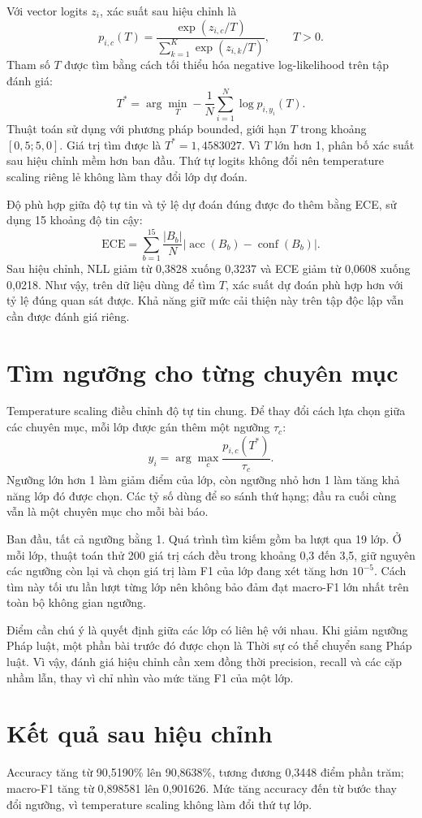 Với vector logits $z_i$, xác suất sau hiệu chỉnh là
\[
p_{i,c}(T)=\frac{\exp(z_{i,c}/T)}{\sum_{k=1}^{K}\exp(z_{i,k}/T)},\qquad T>0.
\]
Tham số $T$ được tìm bằng cách tối thiểu hóa negative log-likelihood trên tập đánh giá:
\[
T^*=\arg\min_T-\frac{1}{N}\sum_{i=1}^{N}\log p_{i,y_i}(T).
\]
Thuật toán sử dụng  với phương pháp bounded, giới hạn $T$ trong khoảng $[0{,}5;5{,}0]$. Giá trị tìm được là $T^*=1{,}4583027$. Vì $T$ lớn hơn 1, phân bố xác suất sau hiệu chỉnh mềm hơn ban đầu. Thứ tự logits không đổi nên temperature scaling riêng lẻ không làm thay đổi lớp dự đoán.

Độ phù hợp giữa độ tự tin và tỷ lệ dự đoán đúng được đo thêm bằng ECE, sử dụng 15 khoảng độ tin cậy:
\[
\mathrm{ECE}=\sum_{b=1}^{15}\frac{|B_b|}{N}\left|\operatorname{acc}(B_b)-\operatorname{conf}(B_b)\right|.
\]
Sau hiệu chỉnh, NLL giảm từ 0,3828 xuống 0,3237 và ECE giảm từ 0,0608 xuống 0,0218. Như vậy, trên dữ liệu dùng để tìm $T$, xác suất dự đoán phù hợp hơn với tỷ lệ đúng quan sát được. Khả năng giữ mức cải thiện này trên tập độc lập vẫn cần được đánh giá riêng.

\section{Tìm ngưỡng cho từng chuyên mục}
Temperature scaling điều chỉnh độ tự tin chung. Để thay đổi cách lựa chọn giữa các chuyên mục, mỗi lớp được gán thêm một ngưỡng $\tau_c$:
\[
\widehat{y}_i=\arg\max_c\frac{p_{i,c}(T^*)}{\tau_c}.
\]
Ngưỡng lớn hơn 1 làm giảm điểm của lớp, còn ngưỡng nhỏ hơn 1 làm tăng khả năng lớp đó được chọn. Các tỷ số dùng để so sánh thứ hạng; đầu ra cuối cùng vẫn là một chuyên mục cho mỗi bài báo.

Ban đầu, tất cả ngưỡng bằng 1. Quá trình tìm kiếm gồm ba lượt qua 19 lớp. Ở mỗi lớp, thuật toán thử 200 giá trị cách đều trong khoảng 0,3 đến 3,5, giữ nguyên các ngưỡng còn lại và chọn giá trị làm F1 của lớp đang xét tăng hơn $10^{-5}$. Cách tìm này tối ưu lần lượt từng lớp nên không bảo đảm đạt macro-F1 lớn nhất trên toàn bộ không gian ngưỡng.

Điểm cần chú ý là quyết định giữa các lớp có liên hệ với nhau. Khi giảm ngưỡng Pháp luật, một phần bài trước đó được chọn là Thời sự có thể chuyển sang Pháp luật. Vì vậy, đánh giá hiệu chỉnh cần xem đồng thời precision, recall và các cặp nhầm lẫn, thay vì chỉ nhìn vào mức tăng F1 của một lớp.

\section{Kết quả sau hiệu chỉnh}
\begin{table}[htbp]\centering\small

\caption{Kết quả trước và sau khi áp dụng temperature scaling kết hợp ngưỡng theo lớp.}\end{table}
Accuracy tăng từ 90,5190\% lên 90,8638\%, tương đương 0,3448 điểm phần trăm; macro-F1 tăng từ 0,898581 lên 0,901626. Mức tăng accuracy đến từ bước thay đổi ngưỡng, vì temperature scaling không làm đổi thứ tự lớp.

